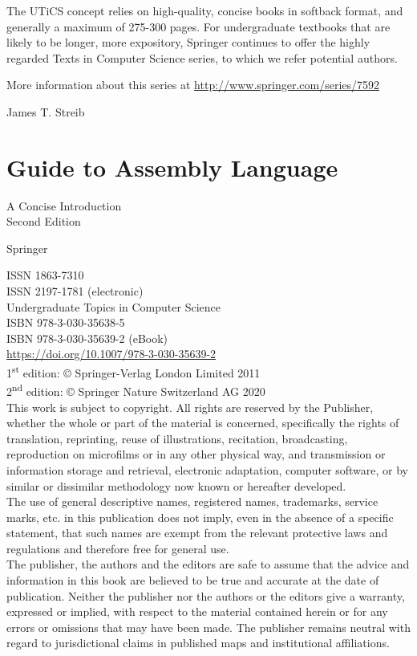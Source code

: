 \documentclass[10pt]{book}
\begin{document}
The UTiCS concept relies on high-quality, concise books in softback format, and generally a maximum of 275-300 pages. For undergraduate textbooks that are likely to be longer, more expository, Springer continues to offer the highly regarded Texts in Computer Science series, to which we refer potential authors.

More information about this series at \href{http://www.springer.com/series/7592}{http://www.springer.com/series/7592}

James T. Streib

\section{Guide to Assembly Language }
A Concise Introduction\\
Second Edition

Springer

ISSN 1863-7310\\
ISSN 2197-1781 (electronic)\\
Undergraduate Topics in Computer Science\\
ISBN 978-3-030-35638-5\\
ISBN 978-3-030-35639-2 (eBook)\\
\href{https://doi.org/10.1007/978-3-030-35639-2}{https://doi.org/10.1007/978-3-030-35639-2}\\
1\textsuperscript{st} edition: © Springer-Verlag London Limited 2011\\
2\textsuperscript{nd} edition: © Springer Nature Switzerland AG 2020\\
This work is subject to copyright. All rights are reserved by the Publisher, whether the whole or part of the material is concerned, specifically the rights of translation, reprinting, reuse of illustrations, recitation, broadcasting, reproduction on microfilms or in any other physical way, and transmission or information storage and retrieval, electronic adaptation, computer software, or by similar or dissimilar methodology now known or hereafter developed.\\
The use of general descriptive names, registered names, trademarks, service marks, etc. in this publication does not imply, even in the absence of a specific statement, that such names are exempt from the relevant protective laws and regulations and therefore free for general use.\\
The publisher, the authors and the editors are safe to assume that the advice and information in this book are believed to be true and accurate at the date of publication. Neither the publisher nor the authors or the editors give a warranty, expressed or implied, with respect to the material contained herein or for any errors or omissions that may have been made. The publisher remains neutral with regard to jurisdictional claims in published maps and institutional affiliations.
\end{document}
